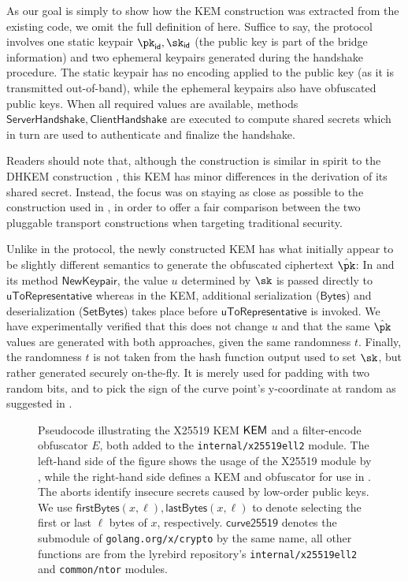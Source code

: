 As our goal is simply to show how the KEM construction was extracted from the existing code, we omit the full definition of \obfsfour{} here. Suffice to say, the protocol involves one static keypair $\pk_\mathsf{id}, \sk_\mathsf{id}$ (the public key is part of the bridge information) and two ephemeral keypairs generated during the handshake procedure. The static keypair has no encoding applied to the public key (as it is transmitted out-of-band), while the ephemeral keypairs also have obfuscated public keys. When all required values are available, methods $\mathsf{ServerHandshake}, \mathsf{ClientHandshake}$ are executed to compute shared secrets which in turn are used to authenticate and finalize the handshake.

Readers should note that, although the construction is similar in spirit to the DHKEM construction \cite[Section~4.1]{rfc9180}, this KEM has minor differences in the derivation of its shared secret. Instead, the focus was on staying as close as possible to the construction used in \obfsfour{}, in order to offer a fair comparison between the two pluggable transport constructions when targeting traditional security.

Unlike in the \obfsfour{} protocol, the newly constructed KEM has what initially appear to be slightly different semantics to generate the obfuscated ciphertext $\hat \pk$:
In \obfsfour{} and its method $\mathsf{NewKeypair}$, the value $u$ determined by $\sk$ is passed directly to $\mathsf{uToRepresentative}$ whereas in the KEM, additional serialization ($\mathsf{Bytes}$) and deserialization ($\mathsf{SetBytes}$) takes place before $\mathsf{uToRepresentative}$ is invoked.
We have experimentally verified that this does not change $u$ and that the same $\hat \pk$ values are generated with both approaches, given the same randomness $t$.
Finally, the randomness $t$ is not taken from the hash function output used to set $\sk$, but rather generated securely on-the-fly. It is merely used for padding with two random bits, and to pick the sign of the curve point's y-coordinate at random as suggested in \cite{elligatorExplicitFormulas}.

\begin{figure}
    
    \caption[
        Pseudocode illustrating the X25519 KEM and filter-encode obfuscator added to the \texttt{internal/x25519ell2} module.
    ]{
        Pseudocode illustrating the X25519 KEM $\mathsf{KEM}$ and a filter-encode obfuscator $E$, both added to the \texttt{internal/x25519ell2} module.
        The left-hand side of the figure shows the usage of the X25519 module by \obfsfour{}, while the right-hand side defines a KEM and obfuscator for use in \drivel{}.
        The aborts identify insecure secrets caused by low-order public keys.
        We use $\mathsf{firstBytes}(x, \ell), \mathsf{lastBytes}(x, \ell)$ to denote selecting the first or last $\ell$ bytes of $x$, respectively.
        $\mathsf{curve25519}$ denotes the submodule of \texttt{golang.org/x/crypto} by the same name, all other functions are from the lyrebird repository's \texttt{internal/x25519ell2} and \texttt{common/ntor} modules.
    }
    \label{fig:impl-x25519-kem}
\end{figure}


